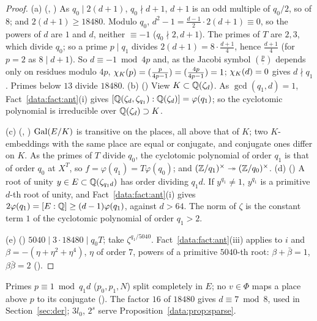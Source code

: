 \begin{proof}
(a) (, ) As
$q_0 \mid 2(d+1)$, $q_0 \nmid d+1$, $d+1$ is an odd multiple of $q_0/2$, so of $8$; and
$2(d+1) \ge 18480$. Modulo $q_0$, $d^2 - 1 = \frac{d-1}2\cdot2(d+1) \equiv 0$, so the powers of
$d$ are $1$ and $d$, neither $\equiv -1$ ($q_0 \nmid 2, d+1$). The primes of $T$
are $2, 3$, which divide $q_0$; so a prime $p \mid q_1$ divides
$2(d+1) = 8\cdot\frac{d+1}4$, hence $\frac{d+1}4$ (for $p = 2$ as $8 \mid d+1$). So
$d \equiv -1 \bmod 4p$ and, as the Jacobi symbol $(\frac p\cdot)$ depends only on residues modulo
$4p$, $\chi_K(p) = (\frac p{4p-1}) = (\frac{4p}{4p-1}) = 1$; $\chi_K(d) = 0$ gives $d \nmid q_1$.
Primes below $13$ divide $18480$.
(b) () View $K \subset \mathbb{Q}(\zeta_d)$. As
$\gcd(q_1,d) = 1$, Fact~\ref{data:fact:ant}(i) gives $[\mathbb{Q}(\zeta_d,\zeta_{q_1}):\mathbb{Q}(\zeta_d)] =
\varphi(q_1)$; so the cyclotomic polynomial is irreducible over $\mathbb{Q}(\zeta_d) \supset K$.

(c) (,
) $\operatorname{Gal}(E/K)$ is transitive on the
places, all above that of $K$; two $K$-embeddings with the same place are equal or conjugate,
and conjugate ones differ on $K$. As the primes of $T$
divide $q_0$, the cyclotomic polynomial of order $q_1$ is that of order $q_0$ at $X^T$, so
$f = \varphi(q_1) = T\varphi(q_0)$; and $(\mathbb{Z}/q_1)^\times \twoheadrightarrow (\mathbb{Z}/q_0)^\times$.
(d) () A root of unity $y \in E \subset \mathbb{Q}(\zeta_{q_1d})$
has order dividing $q_1d$. If $y^{q_1} \ne 1$, $y^{q_1}$ is a primitive $d$-th root of unity, and
Fact~\ref{data:fact:ant}(i) gives $2\varphi(q_1) = [E:\mathbb{Q}] \ge (d-1)\varphi(q_1)$, against $d > 64$.
The norm of $\zeta$ is the constant term $1$ of the cyclotomic polynomial of order $q_1 > 2$.

(e) () $5040 \mid 3\cdot18480 \mid q_0T$; take $\zeta^{q_1/5040}$.
Fact~\ref{data:fact:ant}(iii) applies to $i$ and $\beta = -(\eta+\eta^2+\eta^4)$, $\eta$ of order
$7$, powers of a primitive $5040$-th root: $\beta + \bar\beta = 1$, $\beta\bar\beta = 2$
().
\end{proof}

\begin{remark}\label{data:rem:constants}
Primes $p \equiv 1 \bmod q_1d$ ($p_0, p_1, N$) split completely in $E$; no $v \in \Phi$ maps a
place above $p$ to its conjugate (). The factor $16$ of $18480$
gives $d \equiv 7 \bmod 8$, used in Section~\ref{sec:der}; $3l_0$, $2^s$ serve
Proposition~\ref{data:prop:sparse}.
\end{remark}

